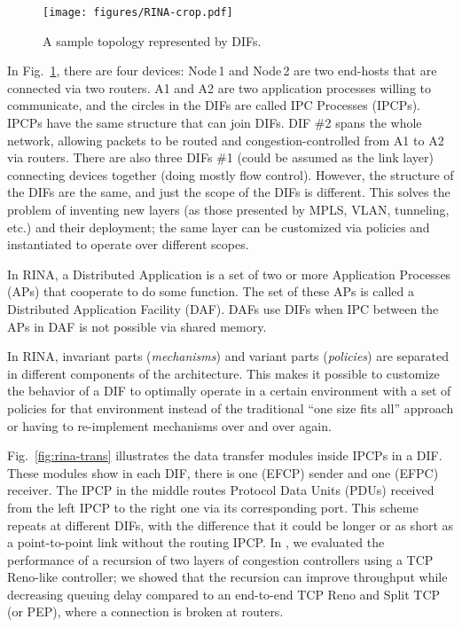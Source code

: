 \documentclass{ieeeaccess}
\begin{document}
\begin{figure}[!t]
	\centering
	\texttt{[image: figures/RINA-crop.pdf]}
	\caption{A sample topology represented by DIFs.}
	\label{fig:rina}
\end{figure}

In Fig.~\ref{fig:rina}, there are four devices: Node\,1 and Node\,2 are two end-hosts that are connected via two routers. A1 and A2 are two application processes willing to communicate, and the circles in the DIFs are called IPC Processes (IPCPs). IPCPs have the same structure that can join DIFs. DIF \#2 spans the whole network, allowing packets to be routed and congestion-controlled from A1 to A2 via routers. There are also three DIFs \#1 (could be assumed as the link layer) connecting devices together (doing mostly flow control). However, the structure of the DIFs are the same, and just the scope of the DIFs is different. This solves the problem of inventing new layers (as those presented by MPLS, VLAN, tunneling, etc.) and their deployment; the same layer can be customized via policies and instantiated to operate over different scopes.

In RINA, a Distributed Application is a set of two or more Application Processes (APs) that cooperate to do some function. The set of these APs is called a Distributed Application Facility (DAF). DAFs use DIFs when IPC between the APs in DAF is not possible via shared memory. 

In RINA, invariant parts (\textit{mechanisms}) and variant parts (\textit{policies}) are separated in different components of the architecture. This makes it possible to customize the behavior of a DIF to optimally operate in a certain environment with a set of policies for that environment instead of the traditional ``one size fits all'' approach or having to re-implement mechanisms over and over again.

Fig.~\ref{fig:rina-trans} illustrates the data transfer modules inside IPCPs in a DIF. These modules show in each DIF, there is one (EFCP) sender and one (EFPC) receiver. The IPCP in the middle routes Protocol Data Units (PDUs) received from the left IPCP to the right one via its corresponding port. This scheme repeats at different DIFs, with the difference that it could be longer or as short as a point-to-point link without the routing IPCP. In \cite{peymanICC16}, we evaluated the performance of a recursion of two layers of congestion controllers using a TCP Reno-like controller; we showed that the recursion can improve throughput while decreasing queuing delay compared to an end-to-end TCP Reno and Split TCP (or PEP), where a connection is broken at routers.
\end{document}
